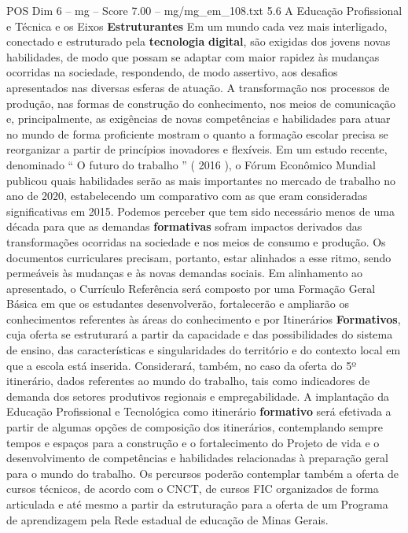 \begin{textsample}{POS Dim 6 – mg – Score 7.00 – mg/mg\_em\_108.txt}  \label{ex:f6_pos_246}
5.6 A Educação Profissional e Técnica e os Eixos \textbf{Estruturantes} Em um mundo cada vez mais interligado, conectado e estruturado pela \textbf{tecnologia} \textbf{digital}, são exigidas dos jovens novas habilidades, de modo que possam se adaptar com maior rapidez às mudanças ocorridas na sociedade, respondendo, de modo assertivo, aos desafios apresentados nas diversas esferas de atuação.
A transformação nos processos de produção, nas formas de construção do conhecimento, nos meios de comunicação e, principalmente, as exigências de novas competências e habilidades para atuar no mundo de forma proficiente mostram o quanto a formação escolar precisa se reorganizar a partir de princípios inovadores e flexíveis.
Em um estudo recente, denominado “ O futuro do trabalho ” ( 2016 ), o Fórum Econômico Mundial publicou quais habilidades serão as mais importantes no mercado de trabalho no ano de 2020, estabelecendo um comparativo com as que eram consideradas significativas em 2015.
Podemos perceber que tem sido necessário menos de uma década para que as demandas \textbf{formativas} sofram impactos derivados das transformações ocorridas na sociedade e nos meios de consumo e produção.
Os documentos curriculares precisam, portanto, estar alinhados a esse ritmo, sendo permeáveis às mudanças e às novas demandas sociais.
Em alinhamento ao apresentado, o Currículo Referência será composto por uma Formação Geral Básica em que os estudantes desenvolverão, fortalecerão e ampliarão os conhecimentos referentes às áreas do conhecimento e por Itinerários \textbf{Formativos}, cuja oferta se estruturará a partir da capacidade e das possibilidades do sistema de ensino, das características e singularidades do território e do contexto local em que a escola está inserida.
Considerará, também, no caso da oferta do 5º itinerário, dados referentes ao mundo do trabalho, tais como indicadores de demanda dos setores produtivos regionais e empregabilidade.
A implantação da Educação Profissional e Tecnológica como itinerário \textbf{formativo} será efetivada a partir de algumas opções de composição dos itinerários, contemplando sempre tempos e espaços para a construção e o fortalecimento do Projeto de vida e o desenvolvimento de competências e habilidades relacionadas à preparação geral para o mundo do trabalho.
Os percursos poderão contemplar também a oferta de cursos técnicos, de acordo com o CNCT, de cursos FIC organizados de forma articulada e até mesmo a partir da estruturação para a oferta de um Programa de aprendizagem pela Rede estadual de educação de Minas Gerais.

\end{textsample}
